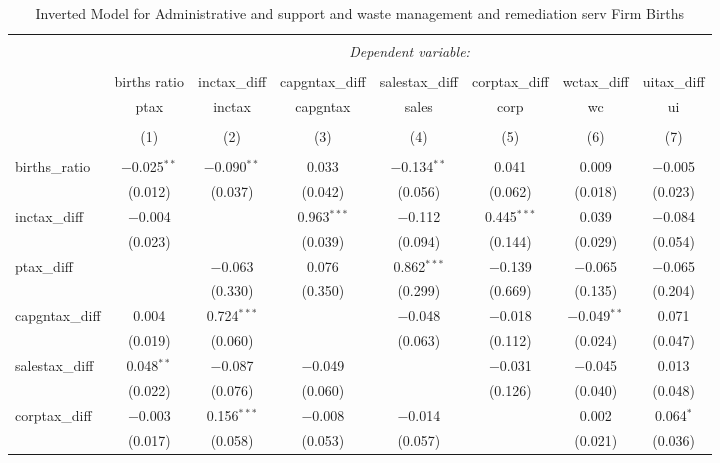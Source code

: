 
\begin{table}[!htbp] \centering 
  \caption{Inverted Model for  Administrative and support and waste management and remediation serv Firm Births} 
  \label{56rd} 
\footnotesize 
\begin{tabular}{@{\extracolsep{5pt}}lccccccc} 
\\[-1.8ex]\hline 
\hline \\[-1.8ex] 
 & \multicolumn{7}{c}{\textit{Dependent variable:}} \\ 
\cline{2-8} 
\\[-1.8ex] & births ratio & inctax\_diff & capgntax\_diff & salestax\_diff & corptax\_diff & wctax\_diff & uitax\_diff \\ 
 & ptax & inctax & capgntax & sales & corp & wc & ui \\ 
\\[-1.8ex] & (1) & (2) & (3) & (4) & (5) & (6) & (7)\\ 
\hline \\[-1.8ex] 
 births\_ratio & $-$0.025$^{**}$ & $-$0.090$^{**}$ & 0.033 & $-$0.134$^{**}$ & 0.041 & 0.009 & $-$0.005 \\ 
  & (0.012) & (0.037) & (0.042) & (0.056) & (0.062) & (0.018) & (0.023) \\ 
  inctax\_diff & $-$0.004 &  & 0.963$^{***}$ & $-$0.112 & 0.445$^{***}$ & 0.039 & $-$0.084 \\ 
  & (0.023) &  & (0.039) & (0.094) & (0.144) & (0.029) & (0.054) \\ 
  ptax\_diff &  & $-$0.063 & 0.076 & 0.862$^{***}$ & $-$0.139 & $-$0.065 & $-$0.065 \\ 
  &  & (0.330) & (0.350) & (0.299) & (0.669) & (0.135) & (0.204) \\ 
  capgntax\_diff & 0.004 & 0.724$^{***}$ &  & $-$0.048 & $-$0.018 & $-$0.049$^{**}$ & 0.071 \\ 
  & (0.019) & (0.060) &  & (0.063) & (0.112) & (0.024) & (0.047) \\ 
  salestax\_diff & 0.048$^{**}$ & $-$0.087 & $-$0.049 &  & $-$0.031 & $-$0.045 & 0.013 \\ 
  & (0.022) & (0.076) & (0.060) &  & (0.126) & (0.040) & (0.048) \\ 
  corptax\_diff & $-$0.003 & 0.156$^{***}$ & $-$0.008 & $-$0.014 &  & 0.002 & 0.064$^{*}$ \\ 
  & (0.017) & (0.058) & (0.053) & (0.057) &  & (0.021) & (0.036) \\ 

\end{tabular}
\end{table}
